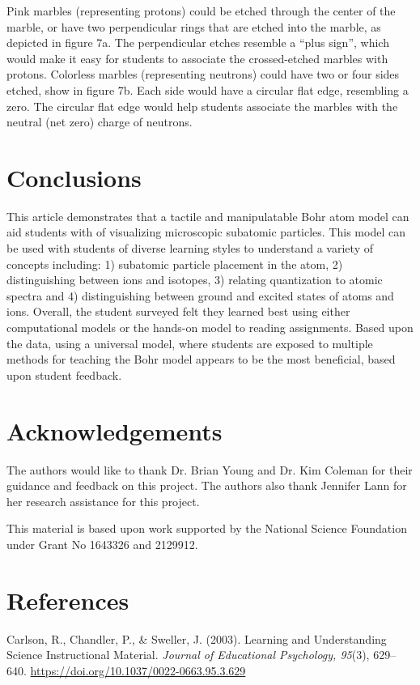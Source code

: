 \documentclass[11pt]{sig-alternate}
\begin{document}
\begin{large}
Pink marbles (representing protons) could be etched through the center of the marble, or have two perpendicular rings that are etched into the marble, as depicted in figure 7a. The perpendicular etches resemble a “plus sign”, which would make it easy for students to associate the crossed-etched marbles with protons. Colorless marbles (representing neutrons) could have two or four sides etched, show in figure 7b. Each side would have a circular flat edge, resembling a zero. The circular flat edge would help students associate the marbles with the neutral (net zero) charge of neutrons.

\section*{Conclusions}
This article demonstrates that a tactile and manipulatable Bohr atom model can aid students with of visualizing microscopic subatomic particles. This model can be used with students of diverse learning styles to understand a variety of concepts including: 1) subatomic particle placement in the atom, 2) distinguishing between ions and isotopes, 3) relating quantization to atomic spectra and 4) distinguishing between ground and excited states of atoms and ions. Overall, the student surveyed felt they learned best using either computational models or the hands-on model to reading assignments. Based upon the data, using a universal model, where students are exposed to multiple methods for teaching the Bohr model appears to be the most beneficial, based upon student feedback.

\section*{Acknowledgements}
The authors would like to thank Dr. Brian Young and Dr. Kim Coleman for their guidance and feedback on this project. The authors also thank Jennifer Lann for her research assistance for this project.

This material is based upon work supported by the National Science Foundation under Grant No 1643326 and 2129912.

\clearpage

\section*{References}\par 

\leftskip 0.25in
\parindent -0.25in 
Carlson, R., Chandler, P., \& Sweller, J. (2003). Learning and Understanding Science Instructional Material. \textit{Journal of Educational Psychology, 95}(3), 629–640. \url{https://doi.org/10.1037/0022-0663.95.3.629}


\end{large}
\end{document}
